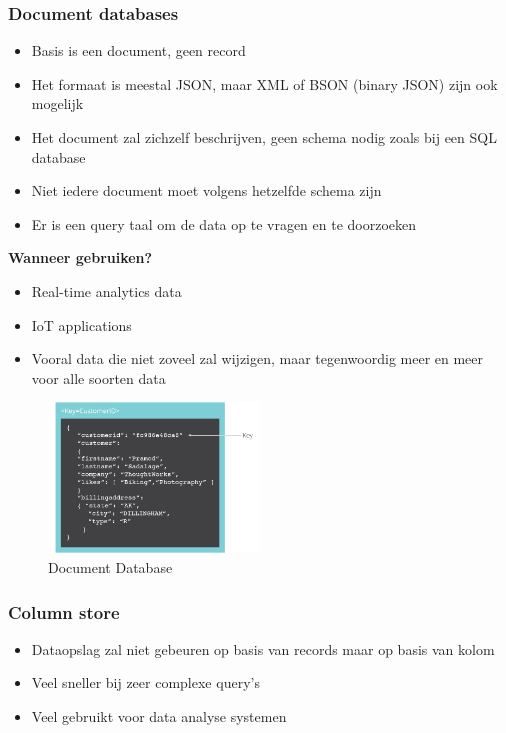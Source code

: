 \documentclass{article}
\newcommand{\bold}[1]{\textbf{#1}}
\begin{document}
\subsubsection{Document databases}

\begin{itemize}
    \item Basis is een document, geen record
    \item Het formaat is meestal JSON, maar XML of BSON (binary JSON) zijn ook mogelijk
    \item Het document zal zichzelf beschrijven, geen schema nodig zoals bij een SQL database
    \item Niet iedere document moet volgens hetzelfde schema zijn
    \item Er is een query taal om de data op te vragen en te doorzoeken
\end{itemize}

\bold{Wanneer gebruiken?}

\begin{itemize}
    \item Real-time analytics data
    \item IoT applications
    \item Vooral data die niet zoveel zal wijzigen, maar tegenwoordig meer en meer voor alle soorten data
\end{itemize}

\begin{figure}[H]
    \centering
    \includegraphics[width=0.5\textwidth]{document-database.png}
    \caption{Document Database}
\end{figure}

\subsubsection{Column store}

\begin{itemize}
    \item Dataopslag zal niet gebeuren op basis van records maar op basis van kolom
    \item Veel sneller bij zeer complexe query's
    \item Veel gebruikt voor data analyse systemen
\end{itemize}
\end{document}
